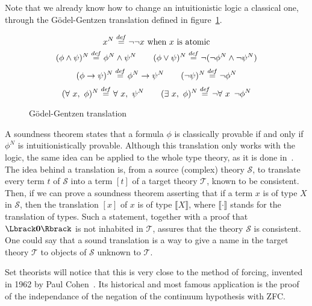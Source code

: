 Note that we already know how to change an intuitionistic logic a
classical one, through the Gödel-Gentzen translation defined in
figure~\ref{fig:GG-trans}.
\begin{figure}[ht]
  \centering

  \[x^N \overset{de\hspace{-0.2ex}f}{=} \lnot\lnot x\text{ when $x$ is atomic}\]
  \[(\phi \land \psi)^N \overset{de\hspace{-0.2ex}f}{=} \phi^N \land \psi^N \qquad
  (\phi\lor \psi)^N \overset{de\hspace{-0.2ex}f}{=} \lnot (\lnot\phi^N \land \lnot \psi^N)\]
  \[(\phi \to \psi)^N \overset{de\hspace{-0.2ex}f}{=} \phi^N \to \psi^N \qquad
    (\lnot \psi)^N \overset{de\hspace{-0.2ex}f}{=} \lnot \phi^N\]
  \[(\forall\ x,\ \phi)^N \defeq \forall\ x,\ \psi^N \qquad
  (\exists\ x,\ \phi)^N \defeq \lnot\forall\ x\,\ \lnot\phi^N\]
  \caption{Gödel-Gentzen translation}
  \label{fig:GG-trans}
\end{figure}
A soundness theorem states that a formula $\phi$ is classically
provable if and only if $\phi^N$ is intuitionistically
provable. Although this translation only works with the logic, the
same idea can be applied to the whole type theory, as it is done
in~\cite{jaber2012extending,forcing2016}. The idea behind a
translation is, from a source (complex) theory $\mathcal S$, to translate every
term $t$ of $\mathcal S$ into a term $[t]$ of a target theory
$\mathcal T$, known to be consistent. Then, if we can prove a
soundness theorem asserting that if a term $x$ is of type $X$ in
$\mathcal S$, then the translation $[x]$ of $x$ is of type $\Lbrack
X\Rbrack$, where $\Lbrack\cdot\Rbrack$ stands for the translation of
types. Such a statement, together with a proof that $\Lbrack \zero
\Rbrack$ is not inhabited in $\mathcal T$, assures that the theory
$\mathcal S$ is consistent. 
One could say that a sound translation is a way to give a name in the
target theory $\mathcal T$ to objects of $\mathcal S$ unknown to
$\mathcal T$.

Set theorists will notice that this is very close to the method of
forcing, invented in 1962 by Paul Cohen~\cite{cohen1966}. Its
historical and most famous application is the proof of the
independance of the negation of the continuum hypothesis with ZFC.






